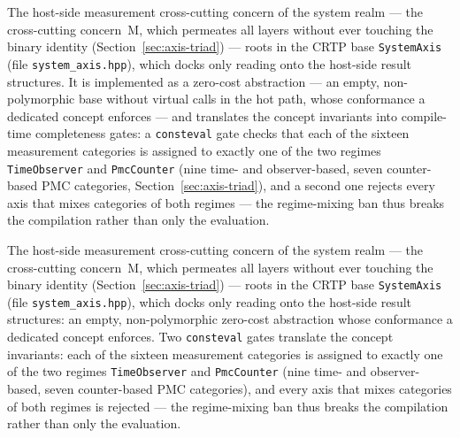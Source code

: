 \begin{nurlang}
The host-side measurement cross-cutting concern of the system realm --- the cross-cutting concern~M,
which permeates all layers without ever touching the binary identity (Section~\ref{sec:axis-triad})
--- roots in the CRTP base \texttt{SystemAxis} (file \texttt{system\_axis.hpp}), which docks only
reading onto the host-side result structures. It is implemented as a zero-cost abstraction --- an
empty, non-polymorphic base without virtual calls in the hot path, whose conformance a dedicated
concept enforces --- and translates the concept invariants into compile-time completeness gates: a
\texttt{consteval} gate checks that each of the sixteen measurement categories is assigned to exactly
one of the two regimes \texttt{TimeObserver} and \texttt{PmcCounter} (nine time- and observer-based,
seven counter-based PMC categories, Section~\ref{sec:axis-triad}), and a second one rejects every axis
that mixes categories of both regimes --- the regime-mixing ban thus breaks the compilation rather than
only the evaluation.
\end{nurlang}
\begin{nurkurz}
The host-side measurement cross-cutting concern of the system realm --- the cross-cutting concern~M,
which permeates all layers without ever touching the binary identity (Section~\ref{sec:axis-triad})
--- roots in the CRTP base \texttt{SystemAxis} (file \texttt{system\_axis.hpp}), which docks only
reading onto the host-side result structures: an empty, non-polymorphic zero-cost abstraction whose
conformance a dedicated concept enforces. Two \texttt{consteval} gates translate the concept
invariants: each of the sixteen measurement categories is assigned to exactly one of the two regimes
\texttt{TimeObserver} and \texttt{PmcCounter} (nine time- and observer-based, seven counter-based PMC
categories), and every axis that mixes categories of both regimes is rejected --- the regime-mixing
ban thus breaks the compilation rather than only the evaluation.
\end{nurkurz}

